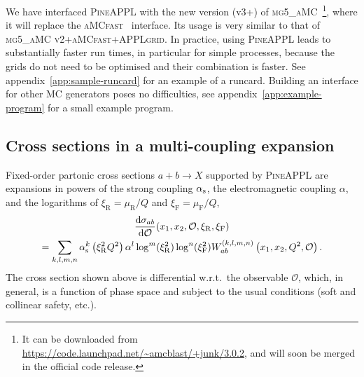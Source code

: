 We have interfaced \textsc{PineAPPL} with the new version (v3+) of \textsc{mg5\_aMC}~\cite{Alwall:2014hca,Frederix:2018nkq}\footnote{It can be downloaded from \url{https://code.launchpad.net/~amcblast/+junk/3.0.2}, and will soon be merged in the official code release.}, where it will replace the \textsc{aMCfast}~\cite{Bertone:2014zva} interface.
Its usage is very similar to that of \textsc{mg5\_aMC v2}+\textsc{aMCfast}+\textsc{APPLgrid}.
In practice, using \textsc{PineAPPL} leads to substantially faster run times, in particular for simple processes, because the grids do not need to be optimised 
and their combination is faster.
See appendix~\ref{app:sample-runcard} for an example of a runcard.
Building an interface for other MC generators poses no difficulties, see appendix~\ref{app:example-program} for a small example program.

\subsection{Cross sections in a multi-coupling expansion}
\label{sec:multi-coupling-expansion}

Fixed-order partonic cross sections $a + b \to X$ supported by \textsc{PineAPPL} are expansions in powers of the strong coupling $\alpha_\mathrm{s}$, the electromagnetic coupling $\alpha$, and the logarithms of $\xi_\mathrm{R} = \mu_\mathrm{R} / Q$ and $\xi_\mathrm{F} = \mu_\mathrm{F} / Q$,
\begin{multline}
\frac{\mathrm{d} \sigma_{ab}}{\mathrm{d} \mathcal{O}} (x_1, x_2, \mathcal{O}, \xi_\mathrm{R}, \xi_\mathrm{F}) \\
= \sum_{k,l,m,n} \alpha_\mathrm{s}^k \left( \xi_\mathrm{R}^2 Q^2 \right) \alpha^l \log^m ( \xi_\mathrm{R}^2 ) \log^n ( \xi_\mathrm{F}^2 ) W_{ab}^{(k,l,m,n)} \left( x_1, x_2, Q^2, \mathcal{O} \right) \text{.}
\label{eq:expansion}
\end{multline}
The cross section shown above is differential w.r.t.\ the observable $\mathcal{O}$, which, in general, is a function of phase space and subject to the usual conditions (soft and collinear safety, etc.).

